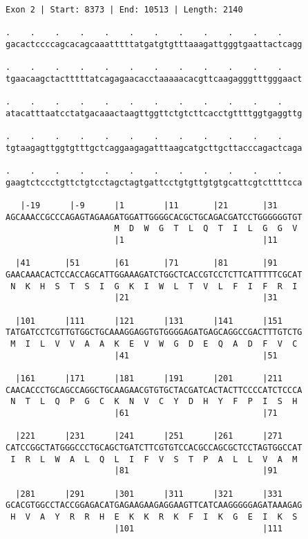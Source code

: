 \documentclass{article}
\begin{document}
\newpage
\begin{Verbatim}
Exon 2 | Start: 8373 | End: 10513 | Length: 2140
 
.    .    .    .    .    .    .    .    .    .    .    .    
gacactccccagcacagcaaatttttatgatgtgtttaaagattgggtgaattactcagg
  
.    .    .    .    .    .    .    .    .    .    .    .    
tgaacaagctactttttatcagagaacacctaaaaacacgttcaagagggtttgggaact
  
.    .    .    .    .    .    .    .    .    .    .    .    
atacatttaatcctatgacaaactaagttggttctgtcttcacctgttttggtgaggttg
  
.    .    .    .    .    .    .    .    .    .    .    .    
tgtaagagttggtgtttgctcaggaagagatttaagcatgcttgcttacccagactcaga
  
.    .    .    .    .    .    .    .    .    .    .    .    
gaagtctccctgttctgtcctagctagtgattcctgtgttgtgtgcattcgtcttttcca
  
   |-19      |-9      |1        |11       |21       |31     
AGCAAACCGCCCAGAGTAGAAGATGGATTGGGGCACGCTGCAGACGATCCTGGGGGGTGT
                      M  D  W  G  T  L  Q  T  I  L  G  G  V 
                      |1                            |11     
  
  |41       |51       |61       |71       |81       |91     
GAACAAACACTCCACCAGCATTGGAAAGATCTGGCTCACCGTCCTCTTCATTTTTCGCAT
 N  K  H  S  T  S  I  G  K  I  W  L  T  V  L  F  I  F  R  I 
                      |21                           |31     
  
  |101      |111      |121      |131      |141      |151    
TATGATCCTCGTTGTGGCTGCAAAGGAGGTGTGGGGAGATGAGCAGGCCGACTTTGTCTG
 M  I  L  V  V  A  A  K  E  V  W  G  D  E  Q  A  D  F  V  C 
                      |41                           |51     
  
  |161      |171      |181      |191      |201      |211    
CAACACCCTGCAGCCAGGCTGCAAGAACGTGTGCTACGATCACTACTTCCCCATCTCCCA
 N  T  L  Q  P  G  C  K  N  V  C  Y  D  H  Y  F  P  I  S  H 
                      |61                           |71     
  
  |221      |231      |241      |251      |261      |271    
CATCCGGCTATGGGCCCTGCAGCTGATCTTCGTGTCCACGCCAGCGCTCCTAGTGGCCAT
 I  R  L  W  A  L  Q  L  I  F  V  S  T  P  A  L  L  V  A  M 
                      |81                           |91     
  
  |281      |291      |301      |311      |321      |331    
GCACGTGGCCTACCGGAGACATGAGAAGAAGAGGAAGTTCATCAAGGGGGAGATAAAGAG
 H  V  A  Y  R  R  H  E  K  K  R  K  F  I  K  G  E  I  K  S 
                      |101                          |111    
  

\end{Verbatim}
\end{document}
